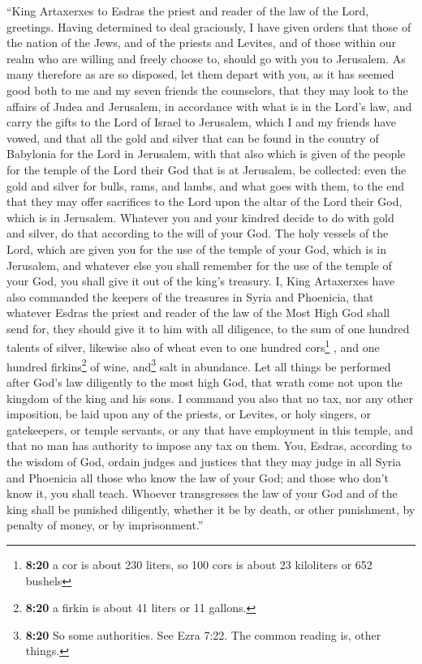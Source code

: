  ``King Artaxerxes to Esdras the priest and reader of the
law of the Lord, greetings.  Having determined to deal
graciously, I have given orders that those of the nation of the Jews,
and of the priests and Levites, and of those within our realm who are
willing and freely choose to, should go with you to Jerusalem.
 As many therefore as are so disposed, let them depart
with you, as it has seemed good both to me and my seven friends the
counselors,  that they may look to the affairs of Judea
and Jerusalem, in accordance with what is in the Lord's law,
 and carry the gifts to the Lord of Israel to Jerusalem,
which I and my friends have vowed, and that all the gold and silver that
can be found in the country of Babylonia for the Lord in Jerusalem,
 with that also which is given of the people for the
temple of the Lord their God that is at Jerusalem, be collected: even
the gold and silver for bulls, rams, and lambs, and what goes with them,
 to the end that they may offer sacrifices to the Lord
upon the altar of the Lord their God, which is in Jerusalem.
 Whatever you and your kindred decide to do with gold and
silver, do that according to the will of your God.  The
holy vessels of the Lord, which are given you for the use of the temple
of your God, which is in Jerusalem,  and whatever else
you shall remember for the use of the temple of your God, you shall give
it out of the king's treasury.  I, King Artaxerxes have
also commanded the keepers of the treasures in Syria and Phoenicia, that
whatever Esdras the priest and reader of the law of the Most High God
shall send for, they should give it to him with all diligence,
 to the sum of one hundred talents of silver, likewise
also of wheat even to one hundred cors\footnote{\textbf{8:20} a cor is
  about 230 liters, so 100 cors is about 23 kiloliters or 652 bushels} ,
and one hundred firkins\footnote{\textbf{8:20} a firkin is about 41
  liters or 11 gallons.} of wine, and\footnote{\textbf{8:20} So some
  authorities. See Ezra 7:22. The common reading is, other things.} salt
in abundance.  Let all things be performed after God's
law diligently to the most high God, that wrath come not upon the
kingdom of the king and his sons.  I command you also
that no tax, nor any other imposition, be laid upon any of the priests,
or Levites, or holy singers, or gatekeepers, or temple servants, or any
that have employment in this temple, and that no man has authority to
impose any tax on them.  You, Esdras, according to the
wisdom of God, ordain judges and justices that they may judge in all
Syria and Phoenicia all those who know the law of your God; and those
who don't know it, you shall teach.  Whoever transgresses
the law of your God and of the king shall be punished diligently,
whether it be by death, or other punishment, by penalty of money, or by
imprisonment.''

